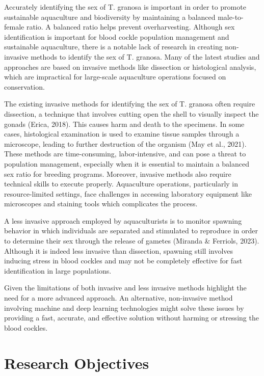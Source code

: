 Accurately identifying the sex of T. granosa is important in order to promote sustainable aquaculture and biodiversity by maintaining a balanced male-to-female ratio. A balanced ratio helps prevent overharvesting. Although sex identification is important for blood cockle population management and sustainable aquaculture, there is a notable lack of research in creating non-invasive methods to identify the sex of T. granosa. Many of the latest studies and approaches are based on invasive methods like dissection or histological analysis, which are impractical for large-scale aquaculture operations focused on conservation.

The existing invasive methods for identifying the sex of T. granosa often require dissection, a technique that involves cutting open the shell to visually inspect the gonads (Erica, 2018). This causes harm and death to the specimens. In some cases, histological examination is used to examine tissue samples through a microscope, leading to further destruction of the organism (May et al., 2021). These methods are time-consuming, labor-intensive, and can pose a threat to population management, especially when it is essential to maintain a balanced sex ratio for breeding programs. Moreover, invasive methods also require technical skills to execute properly. Aquaculture operations, particularly in resource-limited settings, face challenges in accessing laboratory equipment like microscopes and staining tools which complicates the process.

A less invasive approach employed by aquaculturists is to monitor spawning behavior in which individuals are separated and stimulated to reproduce in order to determine their sex through the release of gametes (Miranda & Ferriols, 2023). Although it is indeed less invasive than dissection, spawning still involves inducing stress in blood cockles and may not be completely effective for fast identification in large populations.

Given the limitations of both invasive and less invasive methods highlight the need for a more advanced approach. An alternative, non-invasive method involving machine and deep learning technologies might solve these issues by providing a fast, accurate, and effective solution without harming or stressing the blood cockles.


\section{Research Objectives}
\label{sec:researchobjectives}

